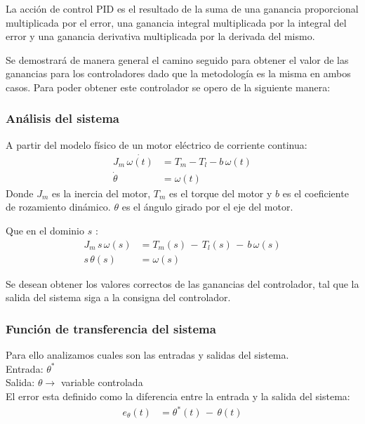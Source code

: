 \documentclass[journal]{IEEEtran}
\begin{document}
La acción de control PID es el resultado de la suma de una ganancia proporcional multiplicada
por el error, una ganancia integral multiplicada por la integral del error y una ganancia
derivativa multiplicada por la derivada del mismo.

Se demostrará de manera general el camino seguido para obtener el valor de las ganancias para 
los controladores dado que la metodología es la misma en ambos casos. Para poder obtener este
controlador se opero de la siguiente manera:

\subsubsection{Análisis del sistema}
A partir del modelo físico de un motor eléctrico de corriente continua:
\begin{align}
  J_m \, \dot{\omega (t)} &= T_m - T_l - b \,{\omega}(t)\\
  \dot{\theta} &={\omega} (t)
\end{align}
Donde $J_m$ es la inercia del motor, $T_m$ es el torque del motor y $b$ es
el coeficiente de rozamiento dinámico. $\theta$ es el ángulo girado por el 
eje del motor.

Que en el dominio $s$ :
\begin{align}
  J_m \, s \, \omega (s) &= T_m (s) \,- \, T_l(s) \, -\,b\,\omega(s)\\
  s \, \theta (s) &= \omega (s)
\end{align}

Se desean obtener los valores correctos de las ganancias
del controlador, tal que la salida del sistema siga a la 
consigna del controlador.

\subsubsection{Función de transferencia del sistema}
Para ello analizamos cuales son las entradas y salidas del sistema.\\
Entrada: $\theta^*$ \\
Salida: $\theta \rightarrow$  variable controlada\\

El error esta definido como la diferencia entre la entrada y la salida del sistema:
 \begin{align}
  e_\theta (t) &= \theta^* (t) \,-\, \theta (t)
 \end{align}
 
\end{document}
